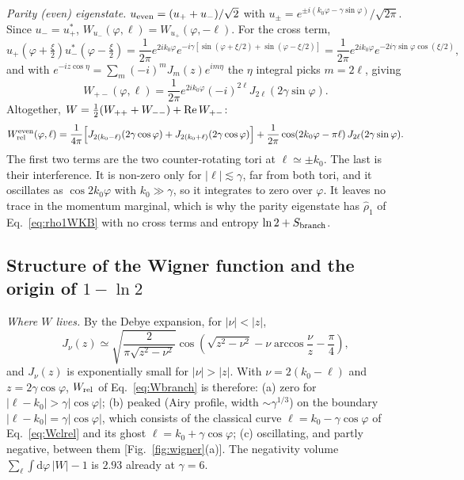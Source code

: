 \documentclass[aps,pra,onecolumn,notitlepage,nofootinbib,11pt]{revtex4-2}
\newcommand{\dd}{\mathrm{d}}
\begin{document}
\emph{Parity (even) eigenstate.} $u_{\rm even}=(u_{+}+u_{-})/\sqrt2$ with
$u_{\pm}=e^{\pm i(k_{0}\varphi-\gamma\sin\varphi)}/\sqrt{2\pi}$. Since $u_{-}=u_{+}^{*}$,
$W_{u_{-}}(\varphi,\ell)=W_{u_{+}}(\varphi,-\ell)$. For the cross term,
\begin{equation}
u_{+}(\varphi+\tfrac\xi2)u_{-}^{*}(\varphi-\tfrac\xi2)=\frac{1}{2\pi}e^{2ik_{0}\varphi}
e^{-i\gamma[\sin(\varphi+\xi/2)+\sin(\varphi-\xi/2)]}=\frac{1}{2\pi}e^{2ik_{0}\varphi}
e^{-2i\gamma\sin\varphi\cos(\xi/2)},
\end{equation}
and with $e^{-iz\cos\eta}=\sum_{m}(-i)^{m}J_{m}(z)e^{im\eta}$ the $\eta$ integral picks
$m=2\ell$, giving
\begin{equation}
W_{+-}(\varphi,\ell)=\frac{1}{2\pi}e^{2ik_{0}\varphi}(-i)^{2\ell}J_{2\ell}(2\gamma\sin\varphi).
\end{equation}
Altogether, $W=\frac12(W_{++}+W_{--})+{\rm Re}\,W_{+-}$:
\begin{equation}
W_{\rm rel}^{\rm even}(\varphi,\ell)=\frac{1}{4\pi}\Big[J_{2(k_{0}-\ell)}(2\gamma\cos\varphi)
+J_{2(k_{0}+\ell)}(2\gamma\cos\varphi)\Big]
+\frac{1}{2\pi}\cos(2k_{0}\varphi-\pi\ell)\,J_{2\ell}(2\gamma\sin\varphi).
\label{eq:Weven}
\end{equation}
The first two terms are the two counter-rotating tori at $\ell\simeq\pm k_{0}$. The last is
their interference. It is non-zero only for $|\ell|\lesssim\gamma$, far from both tori, and it
oscillates as $\cos2k_{0}\varphi$ with $k_{0}\gg\gamma$, so it integrates to zero over $\varphi$. It
leaves no trace in the momentum marginal, which is why the parity eigenstate has
$\hat\rho_{1}$ of Eq.~\eqref{eq:rho1WKB} with no cross terms and entropy $\ln2+S_{\rm branch}$.

\subsection{Structure of the Wigner function and the origin of $1-\ln2$}

\emph{Where $W$ lives.} By the Debye expansion, for $|\nu|<|z|$,
\begin{equation}
J_{\nu}(z)\simeq\sqrt{\frac{2}{\pi\sqrt{z^{2}-\nu^{2}}}}\cos\left(\sqrt{z^{2}-\nu^{2}}
-\nu\arccos\frac{\nu}{z}-\frac{\pi}{4}\right),
\label{eq:DebyeW}
\end{equation}
and $J_{\nu}(z)$ is exponentially small for $|\nu|>|z|$. With $\nu=2(k_{0}-\ell)$ and
$z=2\gamma\cos\varphi$, $W_{\rm rel}$ of Eq.~\eqref{eq:Wbranch} is therefore:
(a) zero for $|\ell-k_{0}|>\gamma|\cos\varphi|$;
(b) peaked (Airy profile, width $\sim\gamma^{1/3}$) on the boundary $|\ell-k_{0}|=\gamma|\cos\varphi|$,
which consists of the classical curve $\ell=k_{0}-\gamma\cos\varphi$ of Eq.~\eqref{eq:Wclrel} and its
ghost $\ell=k_{0}+\gamma\cos\varphi$;
(c) oscillating, and partly negative, between them [Fig.~\ref{fig:wigner}(a)].
The negativity volume $\sum_{\ell}\int\dd\varphi\,|W|-1$ is $2.93$ already at $\gamma=6$.
\end{document}
